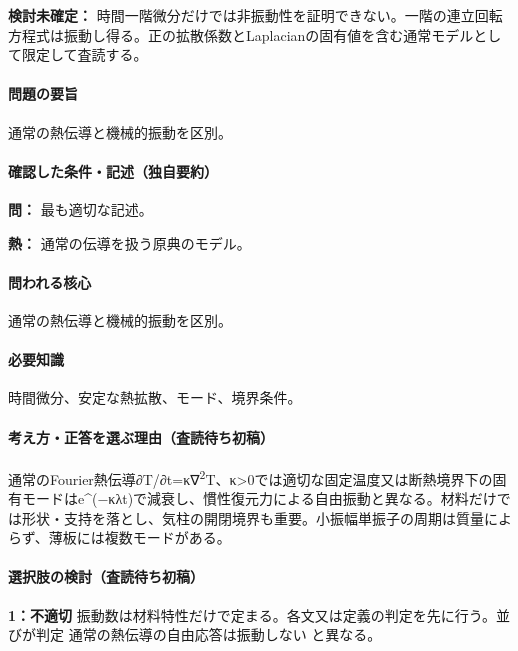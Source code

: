 \par\textbf{検討未確定：} 時間一階微分だけでは非振動性を証明できない。一階の連立回転方程式は振動し得る。正の拡散係数とLaplacianの固有値を含む通常モデルとして限定して査読する。

\paragraph{問題の要旨} 通常の熱伝導と機械的振動を区別。

\paragraph{確認した条件・記述（独自要約）}\mbox{}\par

\noindent\textbf{問：} 最も適切な記述。\par

\noindent\textbf{熱：} 通常の伝導を扱う原典のモデル。\par

\paragraph{問われる核心} 通常の熱伝導と機械的振動を区別。

\paragraph{必要知識} 時間微分、安定な熱拡散、モード、境界条件。

\paragraph{考え方・正答を選ぶ理由（査読待ち初稿）} 通常のFourier熱伝導∂T/∂t=κ∇\textsuperscript{2}T、κ>0では適切な固定温度又は断熱境界下の固有モードはe\textasciicircum{}(−κλt)で減衰し、慣性復元力による自由振動と異なる。材料だけでは形状・支持を落とし、気柱の開閉境界も重要。小振幅単振子の周期は質量によらず、薄板には複数モードがある。

\paragraph{選択肢の検討（査読待ち初稿）}\mbox{}\par

\noindent\textbf{1：不適切} 振動数は材料特性だけで定まる。各文又は定義の判定を先に行う。並びが判定 通常の熱伝導の自由応答は振動しない と異なる。\par

